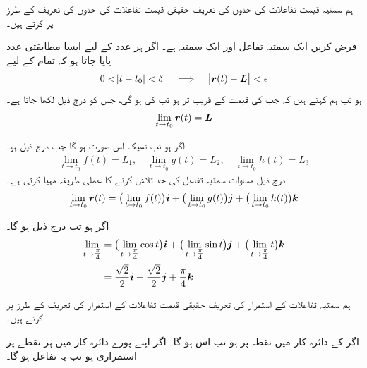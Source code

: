 ہم  سمتیہ  قیمت تفاعلات کی حدوں کی تعریف  حقیقی قیمت تفاعلات کی حدوں  کی تعریف کے طرز پر کرتے ہیں۔

فرض کریں  ایک سمتیہ  تفاعل اور  ایک سمتیہ ہے۔ اگر  ہر عدد  کے لیے    ایسا مطابقتی  عدد  پایا جاتا ہو کہ تمام  کے لیے
\begin{align*}
0<\abs{t-t_0}<\delta\quad \implies \quad \abs{{{\boldsymbol{r}}}(t)-{{\boldsymbol{L}}}}<\epsilon
\end{align*}
ہو تب ہم کہتے ہیں کہ جب   کی قیمت  کے قریب تر ہو تب   کی   ہو گی،   جس کو درج ذیل لکھا جاتا ہے۔
\begin{align*}
\lim_{t\to t_0}{{\boldsymbol{r}}}(t)={{\boldsymbol{L}}}
\end{align*}

اگر  ہو تب  ٹھیک اس صورت   ہو گا جب درج ذیل ہو۔
\begin{align*}
\lim_{t\to t_0}f(t)=L_1,\quad \lim_{t\to t_0}g(t)=L_2,\quad \lim_{t\to t_0}h(t)=L_3
\end{align*}
درج ذیل مساوات سمتیہ  تفاعل کی حد تلاش کرنے کا عملی طریقہ مہیا  کرتی ہے۔
\begin{align}
\lim_{t\to t_0}{{\boldsymbol{r}}}(t)=\big(\lim_{t\to t_0}f(t)\big){\boldsymbol{i}}+\big(\lim_{t\to t_0}g(t)\big){\boldsymbol{j}}+\big(\lim_{t\to t_0}h(t)\big){\boldsymbol{k}}
\end{align}


اگر  ہو تب درج ذیل ہو گا۔
\begin{align*}
\lim_{t\to \tfrac{\pi}{4}}&=\big(\lim_{t\to \tfrac{\pi}{4}}\cos t\big){\boldsymbol{i}}+\big(\lim_{t\to \tfrac{\pi}{4}}\sin t\big){\boldsymbol{j}}+\big(\lim_{t\to \tfrac{\pi}{4}}t\big){\boldsymbol{k}}\\
&=\frac{\sqrt{2}}{2}{\boldsymbol{i}}+\frac{\sqrt{2}}{2}{\boldsymbol{j}}+\frac{\pi}{4}{\boldsymbol{k}}
\end{align*}

ہم سمتیہ  تفاعلات  کے  استمرار کی تعریف  حقیقی قیمت تفاعلات کے استمرار کی تعریف کے  طرز پر  کرتے ہیں۔

اگر  کے دائرہ کار میں نقطہ  پر     ہو تب    اس ہو گا۔ اگر  اپنے پورے دائرہ کار میں ہر نقطے  پر    استمراری ہو تب یہ تفاعل  ہو گا۔


